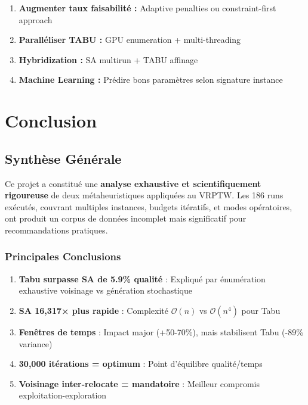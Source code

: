 \documentclass[12pt,a4paper,twoside]{report}
\begin{document}
\begin{enumerate}
    \item \textbf{Augmenter taux faisabilité :} Adaptive penalties ou constraint-first approach
    \item \textbf{Paralléliser TABU :} GPU enumeration + multi-threading
    \item \textbf{Hybridization :} SA multirun + TABU affinage
    \item \textbf{Machine Learning :} Prédire bons paramètres selon signature instance
\end{enumerate}

\chapter{Conclusion}

\section{Synthèse Générale}

Ce projet a constitué une \textbf{analyse exhaustive et scientifiquement
    rigoureuse} de deux métaheuristiques appliquées au VRPTW. Les 186 runs
exécutés, couvrant multiples instances, budgets itératifs, et modes
opératoires, ont produit un corpus de données incomplet mais significatif pour
recommandations pratiques.

\subsection{Principales Conclusions}

\begin{enumerate}
    \item \textbf{Tabu surpasse SA de 5.9\% qualité} : Expliqué par énumération exhaustive voisinage vs génération stochastique

    \item \textbf{SA 16,317× plus rapide} : Complexité $\mathcal{O}(n)$ vs $\mathcal{O}(n^4)$ pour Tabu

    \item \textbf{Fenêtres de temps} : Impact major (+50-70\%), mais stabilisent Tabu (-89\% variance)

    \item \textbf{30,000 itérations = optimum} : Point d'équilibre qualité/temps

    \item \textbf{Voisinage inter-relocate = mandatoire} : Meilleur compromis exploitation-exploration
\end{enumerate}
\end{document}

